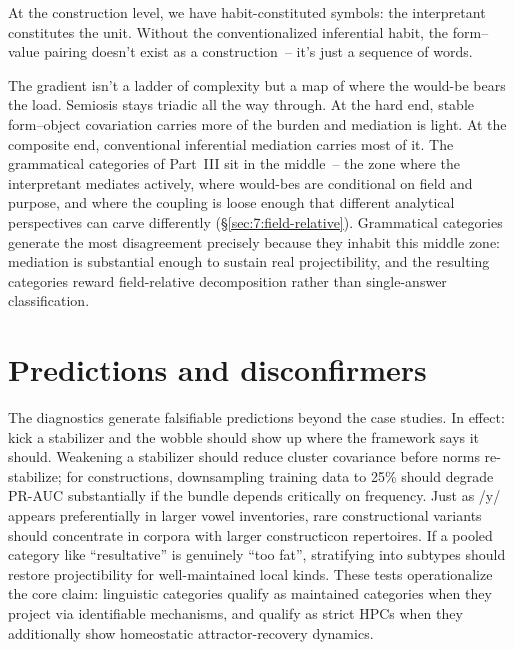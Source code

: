 At the construction level, we have habit-constituted symbols: the interpretant constitutes the unit. Without the conventionalized inferential habit, the form--value pairing doesn't exist as a construction~-- it's just a sequence of words.

The gradient isn't a ladder of complexity but a map of where the would-be bears the load. Semiosis stays triadic all the way through. At the hard end, stable form--object covariation carries more of the burden and mediation is light. At the composite end, conventional inferential mediation carries most of it. The grammatical categories of Part~III sit in the middle~-- the zone where the interpretant mediates actively, where would-bes are conditional on field and purpose, and where the coupling is loose enough that different analytical perspectives can carve differently (§\ref{sec:7:field-relative}). Grammatical categories generate the most disagreement precisely because they inhabit this middle zone: mediation is substantial enough to sustain real projectibility, and the resulting categories reward field-relative decomposition rather than single-answer classification.


\section{Predictions and disconfirmers}
\label{sec:14:predictions}

The diagnostics generate falsifiable predictions beyond the case studies. In effect: kick a stabilizer and the wobble should show up where the framework says it should. Weakening a stabilizer should reduce cluster covariance before norms re-stabilize; for constructions, downsampling training data to 25\% should degrade PR-AUC substantially if the bundle depends critically on frequency. Just as /y/ appears preferentially in larger vowel inventories, rare constructional variants should concentrate in corpora with larger constructicon repertoires. If a pooled category like \enquote{resultative} is genuinely \enquote{too fat}, stratifying into subtypes should restore projectibility for well-maintained local kinds. These tests operationalize the core claim: linguistic categories qualify as maintained categories when they project via identifiable mechanisms, and qualify as strict HPCs when they additionally show homeostatic attractor-recovery dynamics.

